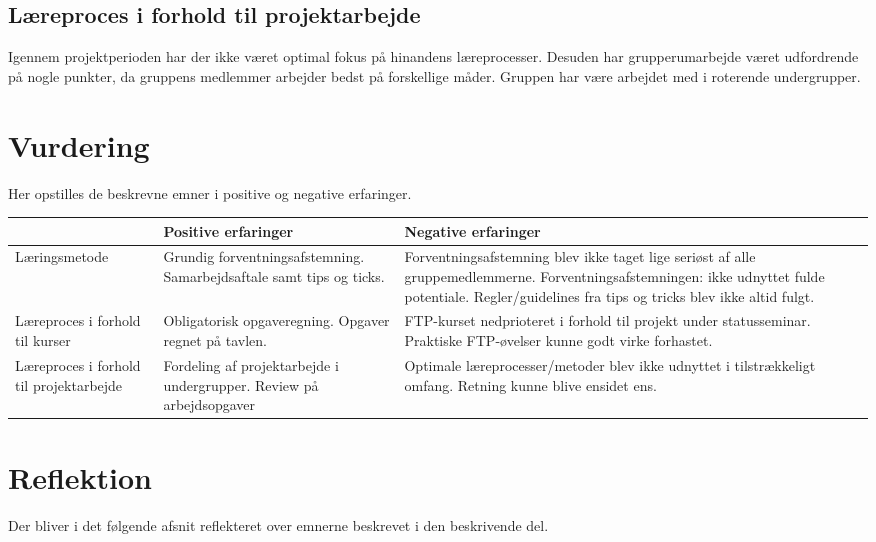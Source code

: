 \subsection{Læreproces i forhold til projektarbejde}
Igennem projektperioden har der ikke været optimal fokus på hinandens læreprocesser. Desuden har grupperumarbejde været udfordrende på nogle punkter, da gruppens medlemmer arbejder bedst på forskellige måder. Gruppen har være arbejdet med i roterende undergrupper.
\clearpage
\section{Vurdering}
Her opstilles de beskrevne emner i positive og negative erfaringer.
\begin{table}[h]
	\begin{tabular}{|p{3cm}|p{5cm}|p{5cm}|}
		\hline
		&\textbf{Positive erfaringer}&\textbf{Negative erfaringer}\\ \hline
	Læringsmetode	& Grundig forventningsafstemning. \newline Samarbejdsaftale samt tips og ticks.& Forventningsafstemning blev ikke taget lige seriøst af alle gruppemedlemmerne. \newline Forventningsafstemningen: ikke udnyttet fulde potentiale.\newline
	 Regler/guidelines fra tips og tricks blev ikke altid fulgt. \\ \hline
	Læreproces i forhold til kurser & Obligatorisk opgaveregning. \newline  Opgaver regnet på tavlen. & FTP-kurset nedprioteret i forhold til projekt under statusseminar. \newline Praktiske FTP-øvelser kunne godt virke forhastet. \\ \hline
	Læreproces i forhold til projektarbejde & Fordeling af projektarbejde i undergrupper. \newline Review på arbejdsopgaver & Optimale læreprocesser/metoder blev ikke udnyttet i tilstrækkeligt omfang. \newline Retning kunne blive ensidet ens. \\ \hline
		
	\end{tabular}
\end{table}

\section{Reflektion}
Der bliver i det følgende afsnit reflekteret over emnerne beskrevet i den beskrivende del.

